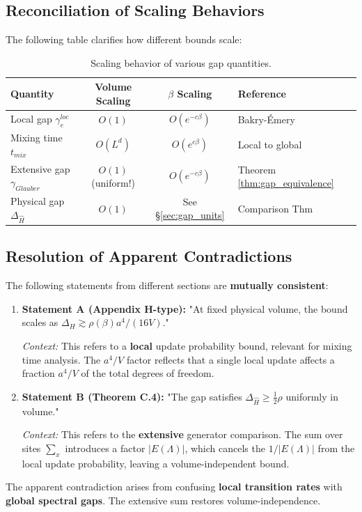 \subsection{Reconciliation of Scaling Behaviors}

The following table clarifies how different bounds scale:

\begin{table}[h]
\centering
\begin{tabular}{|l|c|c|l|}
\hline
\textbf{Quantity} & \textbf{Volume Scaling} & \textbf{$\beta$ Scaling} & \textbf{Reference} \\
\hline
Local gap $\gamma_e^{loc}$ & $O(1)$ & $O(e^{-c\beta})$ & Bakry-Émery \\
\hline
Mixing time $t_{mix}$ & $O(L^d)$ & $O(e^{c\beta})$ & Local to global \\
\hline
Extensive gap $\gamma_{Glauber}$ & $O(1)$ (uniform!) & $O(e^{-c\beta})$ & Theorem \ref{thm:gap_equivalence} \\
\hline
Physical gap $\Delta_{\hat{H}}$ & $O(1)$ & See \S\ref{sec:gap_units} & Comparison Thm \\
\hline
\end{tabular}
\caption{Scaling behavior of various gap quantities.}
\label{tab:gap_scaling}
\end{table}

\subsection{Resolution of Apparent Contradictions}

\begin{proposition}
\label{prop:reconciliation}
The following statements from different sections are \textbf{mutually consistent}:

\begin{enumerate}
    \item \textbf{Statement A (Appendix H-type):} "At fixed physical volume, the bound scales as $\Delta_H \gtrsim \rho(\beta) a^4 / (16V)$."
    
    \textit{Context:} This refers to a \textbf{local} update probability bound, relevant for mixing time analysis. The $a^4/V$ factor reflects that a single local update affects a fraction $a^4/V$ of the total degrees of freedom.
    
    \item \textbf{Statement B (Theorem C.4):} "The gap satisfies $\Delta_{\hat{H}} \geq \frac{1}{2}\rho$ uniformly in volume."
    
    \textit{Context:} This refers to the \textbf{extensive} generator comparison. The sum over sites $\sum_x$ introduces a factor $|E(\Lambda)|$, which cancels the $1/|E(\Lambda)|$ from the local update probability, leaving a volume-independent bound.
\end{enumerate}

The apparent contradiction arises from confusing \textbf{local transition rates} with \textbf{global spectral gaps}. The extensive sum restores volume-independence.
\end{proposition}

